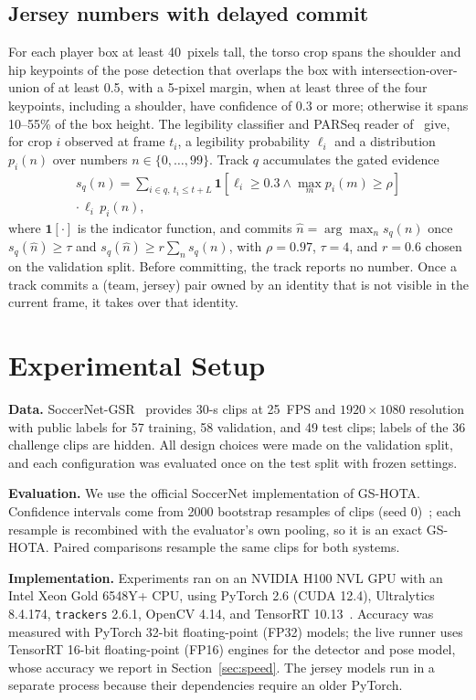 \documentclass[conference]{IEEEtran}
\begin{document}
\subsection{Jersey numbers with delayed commit}
For each player box at least 40~pixels tall, the torso crop spans the shoulder and hip keypoints of the pose detection that overlaps the box with intersection-over-union of at least 0.5, with a 5-pixel margin, when at least three of the four keypoints, including a shoulder, have confidence of 0.3 or more; otherwise it spans 10--55\% of the box height. The legibility classifier and PARSeq reader of~\cite{koshkina2024jersey} give, for crop $i$ observed at frame $t_i$, a legibility probability $\ell_i$ and a distribution $p_i(n)$ over numbers $n\in\{0,\dots,99\}$. Track $q$ accumulates the gated evidence
\begin{multline}
s_q(n)=\sum_{i\in q,\ t_i\le t+L} \mathbf{1}\!\left[\ell_i\ge0.3 \wedge \max_m p_i(m)\ge\rho\right]\\
\cdot\,\ell_i\,p_i(n),
\end{multline}
where $\mathbf{1}[\cdot]$ is the indicator function, and commits $\hat n=\arg\max_n s_q(n)$ once $s_q(\hat n)\ge\tau$ and $s_q(\hat n)\ge r\sum_n s_q(n)$, with $\rho=0.97$, $\tau=4$, and $r=0.6$ chosen on the validation split. Before committing, the track reports no number. Once a track commits a (team, jersey) pair owned by an identity that is not visible in the current frame, it takes over that identity.

\section{Experimental Setup}
\textbf{Data.} SoccerNet-GSR~\cite{somers2024gsr} provides 30-s clips at 25~FPS and $1920\times1080$ resolution with public labels for 57 training, 58 validation, and 49 test clips; labels of the 36 challenge clips are hidden. All design choices were made on the validation split, and each configuration was evaluated once on the test split with frozen settings.

\textbf{Evaluation.} We use the official SoccerNet implementation of GS-HOTA. Confidence intervals come from 2000 bootstrap resamples of clips (seed 0)~\cite{efron1993bootstrap}; each resample is recombined with the evaluator's own pooling, so it is an exact GS-HOTA. Paired comparisons resample the same clips for both systems.

\textbf{Implementation.} Experiments ran on an NVIDIA H100 NVL GPU with an Intel Xeon Gold 6548Y+ CPU, using PyTorch 2.6 (CUDA 12.4), Ultralytics 8.4.174, \texttt{trackers} 2.6.1, OpenCV 4.14, and TensorRT 10.13~\cite{tensorrt}. Accuracy was measured with PyTorch 32-bit floating-point (FP32) models; the live runner uses TensorRT 16-bit floating-point (FP16) engines for the detector and pose model, whose accuracy we report in Section~\ref{sec:speed}. The jersey models run in a separate process because their dependencies require an older PyTorch.
\end{document}
